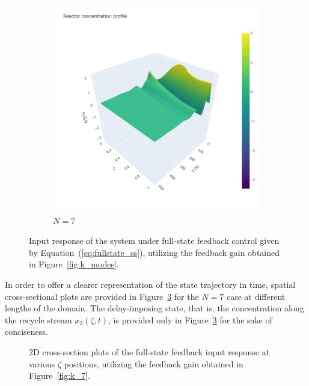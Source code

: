 \begin{figure}[!htbp]
\begin{subfigure}[b]{0.45\textwidth}
        \includegraphics[width=\textwidth,trim=0 0 100 0,clip]{Figures/3D_x1_k7.png}
        \caption{$N=7$}
        \label{fig:3D_x1_k7}
    \end{subfigure}
    \caption{Input response of the system under full-state feedback control given by Equation~(\ref{eq:fullstate_ss}), utilizing the feedback gain obtained in Figure~\ref{fig:k_modes}.}
    \label{fig:full_state_feedback}
\end{figure}

In order to offer a clearer representation of the state trajectory in time, spatial cross-sectional plots are provided in Figure~\ref{fig:2D_xt_k7} for the $N=7$ case at different lengths of the domain. The delay-imposing state, that is, the concentration along the recycle stream $x_2(\zeta,t)$, is provided only in Figure~\ref{fig:2D_xt_k7} for the sake of conciseness.

\begin{figure}[!htbp]
    \centering
    
    \caption{2D cross-section plots of the full-state feedback input response at various $\zeta$ positions, utilizing the feedback gain obtained in Figure~\ref{fig:k_7}.}
    \label{fig:2D_xt_k7}
\end{figure}

